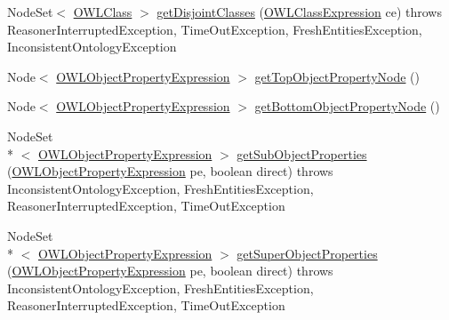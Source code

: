 \begin{DoxyCompactItemize}
\item 
Node\-Set$<$ \hyperlink{interfaceorg_1_1semanticweb_1_1owlapi_1_1model_1_1_o_w_l_class}{O\-W\-L\-Class} $>$ \hyperlink{interfaceorg_1_1semanticweb_1_1owlapi_1_1reasoner_1_1_o_w_l_reasoner_a216f6b9d679846085996dfb7cf9ce388}{get\-Disjoint\-Classes} (\hyperlink{interfaceorg_1_1semanticweb_1_1owlapi_1_1model_1_1_o_w_l_class_expression}{O\-W\-L\-Class\-Expression} ce)  throws Reasoner\-Interrupted\-Exception, Time\-Out\-Exception, Fresh\-Entities\-Exception, Inconsistent\-Ontology\-Exception
\item 
Node$<$ \hyperlink{interfaceorg_1_1semanticweb_1_1owlapi_1_1model_1_1_o_w_l_object_property_expression}{O\-W\-L\-Object\-Property\-Expression} $>$ \hyperlink{interfaceorg_1_1semanticweb_1_1owlapi_1_1reasoner_1_1_o_w_l_reasoner_aef6ef67c91df245a5b88bf447a6befb2}{get\-Top\-Object\-Property\-Node} ()
\item 
Node$<$ \hyperlink{interfaceorg_1_1semanticweb_1_1owlapi_1_1model_1_1_o_w_l_object_property_expression}{O\-W\-L\-Object\-Property\-Expression} $>$ \hyperlink{interfaceorg_1_1semanticweb_1_1owlapi_1_1reasoner_1_1_o_w_l_reasoner_a6d54e782acea28b4cf09d85dd94708ce}{get\-Bottom\-Object\-Property\-Node} ()
\item 
Node\-Set\\*
$<$ \hyperlink{interfaceorg_1_1semanticweb_1_1owlapi_1_1model_1_1_o_w_l_object_property_expression}{O\-W\-L\-Object\-Property\-Expression} $>$ \hyperlink{interfaceorg_1_1semanticweb_1_1owlapi_1_1reasoner_1_1_o_w_l_reasoner_a63bd4a8c777d621c1cb8b3000596b631}{get\-Sub\-Object\-Properties} (\hyperlink{interfaceorg_1_1semanticweb_1_1owlapi_1_1model_1_1_o_w_l_object_property_expression}{O\-W\-L\-Object\-Property\-Expression} pe, boolean direct)  throws Inconsistent\-Ontology\-Exception, Fresh\-Entities\-Exception, Reasoner\-Interrupted\-Exception, Time\-Out\-Exception
\item 
Node\-Set\\*
$<$ \hyperlink{interfaceorg_1_1semanticweb_1_1owlapi_1_1model_1_1_o_w_l_object_property_expression}{O\-W\-L\-Object\-Property\-Expression} $>$ \hyperlink{interfaceorg_1_1semanticweb_1_1owlapi_1_1reasoner_1_1_o_w_l_reasoner_a8b12e2ed0131e57b8523b95f540c1326}{get\-Super\-Object\-Properties} (\hyperlink{interfaceorg_1_1semanticweb_1_1owlapi_1_1model_1_1_o_w_l_object_property_expression}{O\-W\-L\-Object\-Property\-Expression} pe, boolean direct)  throws Inconsistent\-Ontology\-Exception, Fresh\-Entities\-Exception, Reasoner\-Interrupted\-Exception, Time\-Out\-Exception
\item 

\end{DoxyCompactItemize}
